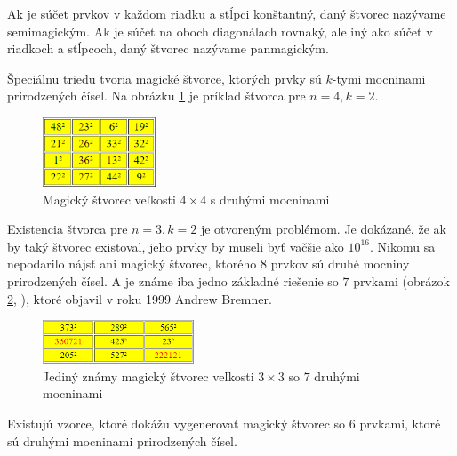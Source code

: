 \begin{subnote} Ak je súčet prvkov v každom riadku a stĺpci konštantný, daný štvorec nazývame semimagickým. Ak je súčet na oboch diagonálach rovnaký, ale iný ako súčet v riadkoch a stĺpcoch, daný štvorec nazývame panmagickým.
\end{subnote}

Špeciálnu triedu tvoria magické štvorce, ktorých prvky sú $k$-tymi mocninami prirodzených čísel. Na obrázku \ref{obr:fig_squared_magic_4x4} je príklad štvorca pre $n = 4, k = 2$.

\begin{figure}[H]
\centerline{\includegraphics[width=0.3\textwidth]{images/squared_magic_4x4}}
\caption[Magický štvorec veľkosti $4 \times 4$ s druhými mocninami]{Magický štvorec veľkosti $4 \times 4$ s druhými mocninami \cite{multimagie}}
\label{obr:fig_squared_magic_4x4}
\end{figure}

Existencia štvorca pre $n = 3, k = 2$ je otvoreným problémom. Je dokázané, že ak by taký štvorec existoval, jeho prvky by museli byť vačšie ako $10^16$. Nikomu sa nepodarilo nájsť ani magický štvorec, ktorého $8$ prvkov sú druhé mocniny prirodzených čísel. A je známe iba jedno základné riešenie so $7$ prvkami (obrázok \ref{obr:fig_bremner_magic_3x3}, \cite{multimagie}), ktoré objavil v roku 1999 Andrew Bremner.

\begin{figure}[H]
\centerline{\includegraphics[width=0.4\textwidth]{images/bremner_magic_3x3}}
\caption[Magický štvorec veľkosti $3 \times 3$ so $7$ druhými mocninami]{Jediný známy magický štvorec veľkosti $3 \times 3$ so $7$ druhými mocninami \cite{multimagie}}
\label{obr:fig_bremner_magic_3x3}
\end{figure}

\begin{subnote} Existujú vzorce, ktoré dokážu vygenerovať magický štvorec so $6$ prvkami, ktoré sú druhými mocninami prirodzených čísel.
\end{subnote}

